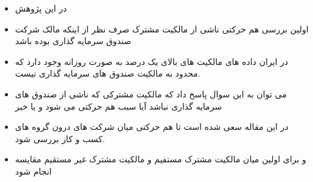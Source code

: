 \documentclass[12pt, a4paper]{article}
\begin{document}
\begin{itemize}
\item 
در این پژوهش 
\item
اولین بررسی هم حرکتی ناشی از مالکیت مشترک صرف نظر از اینکه مالک شرکت صندوق سرمایه گذاری بوده باشد

\item 
در ایران داده های مالکیت های بالای یک درصد به صورت روزانه وجود دارد که محدود به مالکیت صندوق های سرمایه گذاری نیست.
\item
می توان به این سوال پاسخ داد که مالکیت مشترکی که ناشی از صندوق های سرمایه گذاری نباشد آیا سبب هم حرکتی می شود و یا خیر
\end{itemize}





\begin{itemize}
\item
در این مقاله سعی شده است تا هم حرکتی میان شرکت های درون گروه های کسب و کار بررسی شود.

\item 
و برای اولین میان مالکیت مشترک مستفیم و مالکیت مشترک غیر مستقیم مقایسه انجام شود

\end{itemize}
 
\end{document}
